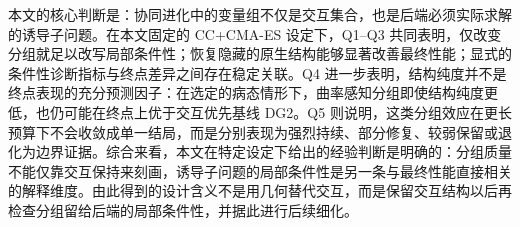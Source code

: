本文的核心判断是：协同进化中的变量组不仅是交互集合，也是后端必须实际求解的诱导子问题。在本文固定的 CC+CMA-ES 设定下，Q1--Q3 共同表明，仅改变分组就足以改写局部条件性；恢复隐藏的原生结构能够显著改善最终性能；显式的条件性诊断指标与终点差异之间存在稳定关联。Q4 进一步表明，结构纯度并不是终点表现的充分预测因子：在选定的病态情形下，曲率感知分组即使结构纯度更低，也仍可能在终点上优于交互优先基线 DG2。Q5 则说明，这类分组效应在更长预算下不会收敛成单一结局，而是分别表现为强烈持续、部分修复、较弱保留或退化为边界证据。综合来看，本文在特定设定下给出的经验判断是明确的：分组质量不能仅靠交互保持来刻画，诱导子问题的局部条件性是另一条与最终性能直接相关的解释维度。由此得到的设计含义不是用几何替代交互，而是保留交互结构以后再检查分组留给后端的局部条件性，并据此进行后续细化。
